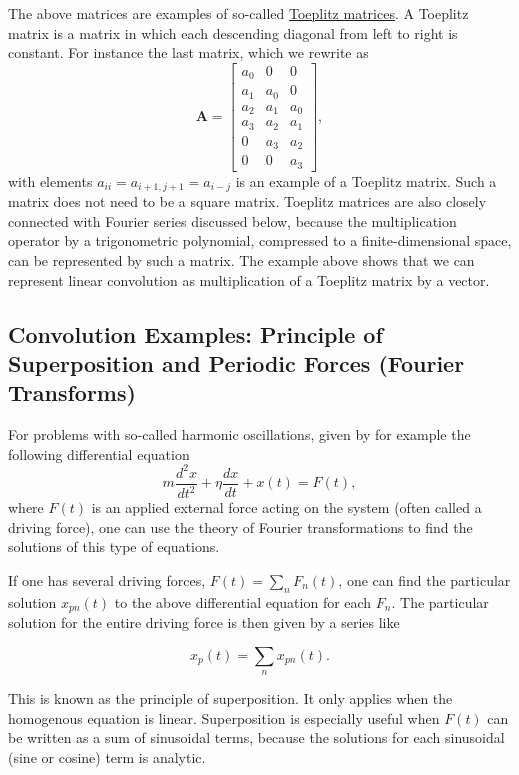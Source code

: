 \documentclass[%
oneside,                 %
final,                   %
10pt]{article}
\begin{document}
The above matrices are examples of so-called \href{{https://link.springer.com/book/10.1007/978-93-86279-04-0}}{Toeplitz
matrices}. A
Toeplitz matrix is a matrix in which each descending diagonal from
left to right is constant. For instance the last matrix, which we
rewrite as
\[
\bm{A}=\begin{bmatrix}a_0 & 0 & 0  \\
                            a_1 & a_0 & 0  \\
			    a_2 & a_1 & a_0  \\
			    a_3 & a_2 & a_1 \\
			    0 & a_3 & a_2 \\
			    0 & 0 & a_3
			    \end{bmatrix},
\]
with elements $a_{ii}=a_{i+1,j+1}=a_{i-j}$ is an example of a Toeplitz
matrix. Such a matrix does not need to be a square matrix.  Toeplitz
matrices are also closely connected with Fourier series discussed
below, because the multiplication operator by a trigonometric
polynomial, compressed to a finite-dimensional space, can be
represented by such a matrix. The example above shows that we can
represent linear convolution as multiplication of a Toeplitz matrix by
a vector.

\subsection{Convolution Examples: Principle of Superposition and Periodic Forces (Fourier Transforms)}

For problems with so-called harmonic oscillations, given by for example the following differential equation
\[
m\frac{d^2x}{dt^2}+\eta\frac{dx}{dt}+x(t)=F(t),
\]
where $F(t)$ is an applied external force acting on the system (often
called a driving force), one can use the theory of Fourier
transformations to find the solutions of this type of equations.

If one has several driving forces, $F(t)=\sum_n F_n(t)$, one can find
the particular solution $x_{pn}(t)$ to the above differential equation for each $F_n$. The particular
solution for the entire driving force is then given by a series like

\begin{equation}
x_p(t)=\sum_nx_{pn}(t).
\end{equation}

This is known as the principle of superposition. It only applies when
the homogenous equation is linear. 
Superposition is especially useful when $F(t)$ can be written
as a sum of sinusoidal terms, because the solutions for each
sinusoidal (sine or cosine)  term is analytic. 
\end{document}
